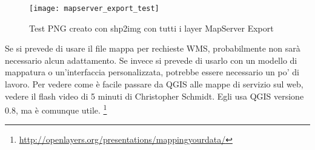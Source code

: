 \begin{figure}[ht]
\begin{center}
  \caption{Test PNG creato con shp2img con tutti i layer MapServer Export \nixcaption}
  \label{fig:mapserver_export_test}\smallskip
  \texttt{[image: mapserver\_export\_test]}
\end{center}
\end{figure}

Se si prevede di usare il file mappa per rechieste WMS, probabilmente non sarà necessario alcun adattamento. Se invece si prevede di usarlo con un modello di mappatura o un'interfaccia personalizzata, potrebbe essere necessario un po' di lavoro. Per vedere come è facile passare da QGIS alle mappe di servizio sul web, vedere il flash video di 5 minuti di
Christopher Schmidt. Egli usa QGIS versione 0.8, ma è comunque utile.
\footnote{\url{http://openlayers.org/presentations/mappingyourdata/}}
